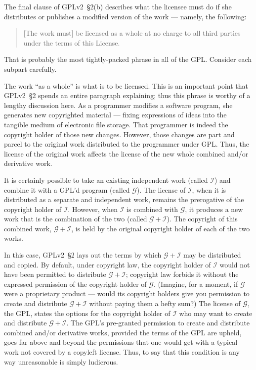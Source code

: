 The final clause of GPLv2~\S2(b) describes what the licensee must do if she
distributes or publishes a modified version of the work --- namely, the following:
\begin{quote}
[The work must] be licensed as a whole at no charge to all third parties
under the terms of this License.
\end{quote}
That is probably the most tightly-packed phrase in all of the GPL\@.
Consider each subpart carefully.

The work ``as a whole'' is what is to be licensed. This is an important
point that GPLv2~\S2 spends an entire paragraph explaining; thus this phrase is
worthy of a lengthy discussion here.  As a programmer modifies a software
program, she generates new copyrighted material --- fixing expressions of
ideas into the tangible medium of electronic file storage.  That
programmer is indeed the copyright holder of those new changes.  However,
those changes are part and parcel to the original work distributed to
the programmer under GPL\@. Thus, the license of the original work
affects the license of the new whole combined and/or derivative work.

\newcommand{\gplusi}{$\mathcal{G\!\!+\!\!I}$}
\newcommand{\worki}{$\mathcal{I}$}
\newcommand{\workg}{$\mathcal{G}$}

\label{separate-and-independent}

It is certainly possible to take an existing independent work (called
\worki{}) and combine it with a GPL'd program (called \workg{}).  The
license of \worki{}, when it is distributed as a separate and independent
work, remains the prerogative of the copyright holder of \worki{}.
However, when \worki{} is combined with \workg{}, it produces a new work
that is the combination of the two (called \gplusi{}). The copyright of
this combined work, \gplusi{}, is held by the original copyright
holder of each of the two works.

In this case, GPLv2~\S2 lays out the terms by which \gplusi{} may be
distributed and copied.  By default, under copyright law, the copyright
holder of \worki{} would not have been permitted to distribute \gplusi{};
copyright law forbids it without the expressed permission of the copyright
holder of \workg{}. (Imagine, for a moment, if \workg{} were a proprietary
product --- would its copyright holders  give you permission to create and distribute
\gplusi{} without paying them a hefty sum?)  The license of \workg{}, the
GPL, states the  options for the copyright holder of \worki{}
who may want to create and distribute \gplusi{}. The  GPL's pre-granted
permission to create and distribute combined and/or derivative works, provided the terms
of the GPL are upheld, goes far above and beyond the permissions that one
would get with a typical work not covered by a copyleft license.  Thus, to
say that this condition is any way unreasonable is simply ludicrous.


